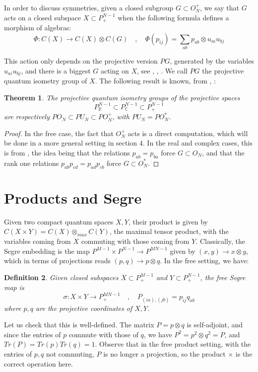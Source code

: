\documentclass[11pt]{article}
\theoremstyle{plain}
\newtheorem{theorem}{Theorem}[section]
\newtheorem{definition}[theorem]{Definition}
\begin{document}
In order to discuss symmetries, given a closed subgroup $G\subset O_N^+$, we say that $G$ acts on a closed subspace $X\subset P^{N-1}_+$ when the following formula defines a morphism of algebras:
$$\Phi:C(X)\to C(X)\otimes C(G)\quad,\quad
\Phi(p_{ij})=\sum_{ab}p_{ab}\otimes u_{ai}u_{bj}$$

This action only depends on the projective version $PG$, generated by the variables $u_{ai}u_{bj}$, and there is a biggest $G$ acting on $X$, see \cite{ba1}, \cite{bgo}, \cite{go1}. We call $PG$ the projective quantum isometry group of $X$. The following result is known, from \cite{ba1}, \cite{bgo}:

\begin{theorem}
\label{thm:projiso}
The projective quantum isometry groups of the projective spaces
$$P^{N-1}_\mathbb R\subset P^{N-1}_\mathbb C\subset P^{N-1}_+$$
are respectively $PO_N\subset PU_N\subset PO_N^+$, with $PU_N=PO_N^*$.
\end{theorem}

\begin{proof}
In the free case, the fact that $O_N^+$ acts is a direct computation, which will be done in a more general setting in section 4. In the real and complex cases, this is from \cite{ba1}, the idea being that the relations $p_{ab}=p_{ba}$ force $G\subset O_N$, and that the rank one relations $p_{ab}p_{cd}=p_{ad}p_{cb}$ force $G\subset O_N^*$.
\end{proof}

\section{Products and Segre}

Given two compact quantum spaces $X,Y$, their product is given by $C(X\times Y)=C(X)\otimes_{max}C(Y)$, the maximal tensor product, with the variables coming from $X$ commuting with those coming from $Y$. Classically, the Segre embedding is the map $P^{M-1}\times P^{N-1}\to P^{MN-1}$ given by $(x,y)\to x\otimes y$, which in terms of projections reads $(p,q)\to p\otimes q$. In the free setting, we have:

\begin{definition}
Given closed subspaces $X\subset P^{M-1}_+$ and $Y\subset P^{N-1}_+$, the free Segre map is
$$\sigma:X\times Y\to P^{MN-1}_+\quad,\quad
P_{(ia),(jb)}=p_{ij}q_{ab}$$
where $p,q$ are the projective coordinates of $X,Y$.
\end{definition}

Let us check that this is well-defined. The matrix $P=p\otimes q$ is self-adjoint, and since the entries of $p$ commute with those of $q$, we have $P^2=p^2\otimes q^2=P$, and $Tr(P)=Tr(p)Tr(q)=1$. Observe that in the free product setting, with the entries of $p,q$ not commuting, $P$ is no longer a projection, so the product $\times$ is the correct operation here.
\end{document}
